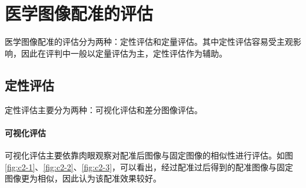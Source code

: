 \section{医学图像配准的评估}

医学图像配准的评估分为两种：定性评估和定量评估。其中定性评估容易受主观影响，因此在评判中一般以定量评估为主，定性评估作为辅助。

\subsection{定性评估}

定性评估主要分为两种：可视化评估和差分图像评估。

\paragraph{可视化评估}

可视化评估主要依靠肉眼观察对配准后图像与固定图像的相似性进行评估。如图\ref{fig:c2-1}、\ref{fig:c2-2}、\ref{fig:c2-3}，可以看出，经过配准过后得到的配准图像与固定图像更为相似，因此认为该配准效果较好。

        
    
        
        

